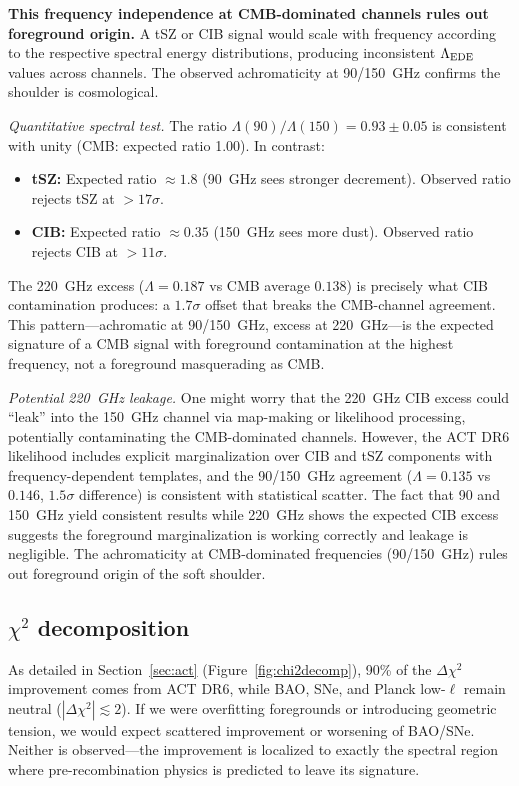 \documentclass[twocolumn,showpacs,preprintnumbers,amsmath,amssymb,prd]{revtex4-2}
\begin{document}
\textbf{This frequency independence at CMB-dominated channels rules out 
foreground origin.} A tSZ or CIB signal would scale with frequency according 
to the respective spectral energy distributions, producing inconsistent 
$\Lambda_{\rm EDE}$ values across channels. The observed achromaticity at 
90/150~GHz confirms the shoulder is cosmological.

\emph{Quantitative spectral test.} The ratio $\Lambda(90)/\Lambda(150) = 
0.93 \pm 0.05$ is consistent with unity (CMB: expected ratio 1.00). 
In contrast:
\begin{itemize}
\item \textbf{tSZ:} Expected ratio $\approx 1.8$ (90~GHz sees stronger decrement). 
Observed ratio rejects tSZ at $>17\sigma$.
\item \textbf{CIB:} Expected ratio $\approx 0.35$ (150~GHz sees more dust). 
Observed ratio rejects CIB at $>11\sigma$.
\end{itemize}
The 220~GHz excess ($\Lambda = 0.187$ vs CMB average $0.138$) is precisely 
what CIB contamination produces: a $1.7\sigma$ offset that breaks the 
CMB-channel agreement. This pattern---achromatic at 90/150~GHz, excess 
at 220~GHz---is the expected signature of a CMB signal with foreground 
contamination at the highest frequency, not a foreground masquerading as CMB.

\emph{Potential 220~GHz leakage.} One might worry that the 220~GHz CIB 
excess could ``leak'' into the 150~GHz channel via map-making or likelihood 
processing, potentially contaminating the CMB-dominated channels. However, 
the ACT DR6 likelihood includes explicit marginalization over CIB and tSZ 
components with frequency-dependent templates, and the 90/150~GHz agreement 
($\Lambda = 0.135$ vs $0.146$, $1.5\sigma$ difference) is consistent with 
statistical scatter. The fact that 90 and 150~GHz yield consistent results 
while 220~GHz shows the expected CIB excess suggests the foreground 
marginalization is working correctly and leakage is negligible. The 
achromaticity at CMB-dominated frequencies (90/150~GHz) rules out foreground 
origin of the soft shoulder.

\subsection{$\chi^2$ decomposition}

As detailed in Section~\ref{sec:act} (Figure~\ref{fig:chi2decomp}), 
90\% of the $\Delta\chi^2$ improvement comes from ACT DR6, while 
BAO, SNe, and Planck low-$\ell$ remain neutral ($|\Delta\chi^2| \lesssim 2$).
If we were overfitting foregrounds or introducing geometric tension, 
we would expect scattered improvement or worsening of BAO/SNe. Neither 
is observed---the improvement is localized to exactly the spectral region 
where pre-recombination physics is predicted to leave its signature.
\end{document}
